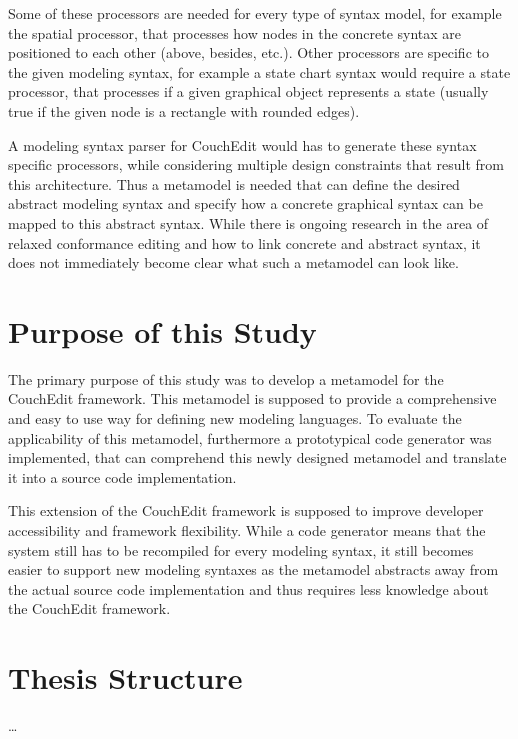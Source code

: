 Some of these processors are needed for every type of syntax model, for example the spatial processor, that processes how nodes in the concrete syntax are positioned to each other (above, besides, etc.). Other processors are specific to the given modeling syntax, for example a state chart syntax would require a state processor, that processes if a given graphical object represents a state (usually true if the given node is a rectangle with rounded edges).

A modeling syntax parser for CouchEdit would has to generate these syntax specific processors, while considering multiple design constraints that result from this architecture. Thus a metamodel is needed that can define the desired abstract modeling syntax and specify how a concrete graphical syntax can be mapped to this abstract syntax. While there is ongoing research in the area of relaxed conformance editing and how to link concrete and abstract syntax, it does not immediately become clear what such a metamodel can look like.

\section{Purpose of this Study}
The primary purpose of this study was to develop a metamodel for the CouchEdit framework. This metamodel is supposed to provide a comprehensive and easy to use way for defining new modeling languages. To evaluate the applicability of this metamodel, furthermore a prototypical code generator was implemented, that can comprehend this newly designed metamodel and translate it into a source code implementation.

This extension of the CouchEdit framework is supposed to improve developer accessibility and framework flexibility. While a code generator means that the system still has to be recompiled for every modeling syntax, it still becomes easier to support new modeling syntaxes as the metamodel abstracts away from the actual source code implementation and thus requires less knowledge about the CouchEdit framework.


\section{Thesis Structure}
\dots